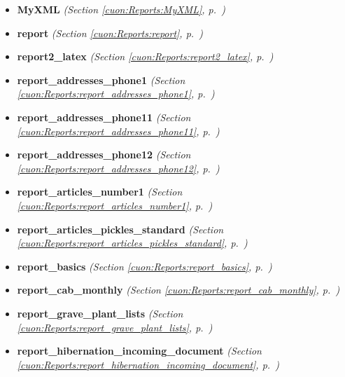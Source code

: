 \begin{itemize}
\setlength{\parskip}{0ex}
\item \textbf{MyXML}
  \textit{(Section \ref{cuon:Reports:MyXML}, p.~\pageref{cuon:Reports:MyXML})}

\item \textbf{report}
  \textit{(Section \ref{cuon:Reports:report}, p.~\pageref{cuon:Reports:report})}

\item \textbf{report2\_latex}
  \textit{(Section \ref{cuon:Reports:report2_latex}, p.~\pageref{cuon:Reports:report2_latex})}

\item \textbf{report\_addresses\_phone1}
  \textit{(Section \ref{cuon:Reports:report_addresses_phone1}, p.~\pageref{cuon:Reports:report_addresses_phone1})}

\item \textbf{report\_addresses\_phone11}
  \textit{(Section \ref{cuon:Reports:report_addresses_phone11}, p.~\pageref{cuon:Reports:report_addresses_phone11})}

\item \textbf{report\_addresses\_phone12}
  \textit{(Section \ref{cuon:Reports:report_addresses_phone12}, p.~\pageref{cuon:Reports:report_addresses_phone12})}

\item \textbf{report\_articles\_number1}
  \textit{(Section \ref{cuon:Reports:report_articles_number1}, p.~\pageref{cuon:Reports:report_articles_number1})}

\item \textbf{report\_articles\_pickles\_standard}
  \textit{(Section \ref{cuon:Reports:report_articles_pickles_standard}, p.~\pageref{cuon:Reports:report_articles_pickles_standard})}

\item \textbf{report\_basics}
  \textit{(Section \ref{cuon:Reports:report_basics}, p.~\pageref{cuon:Reports:report_basics})}

\item \textbf{report\_cab\_monthly}
  \textit{(Section \ref{cuon:Reports:report_cab_monthly}, p.~\pageref{cuon:Reports:report_cab_monthly})}

\item \textbf{report\_grave\_plant\_lists}
  \textit{(Section \ref{cuon:Reports:report_grave_plant_lists}, p.~\pageref{cuon:Reports:report_grave_plant_lists})}

\item \textbf{report\_hibernation\_incoming\_document}
  \textit{(Section \ref{cuon:Reports:report_hibernation_incoming_document}, p.~\pageref{cuon:Reports:report_hibernation_incoming_document})}


\end{itemize}
